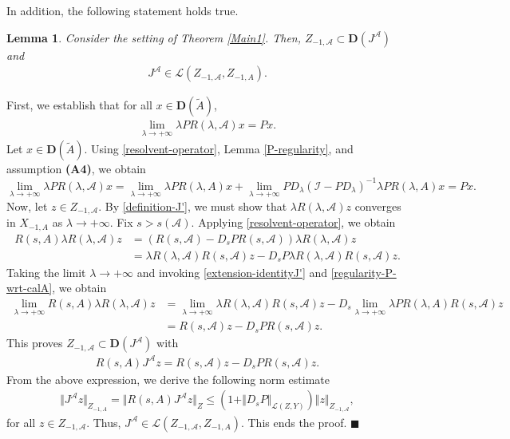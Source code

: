 \documentclass[onecolumn]{autart}
\def\la{\lambda}
\def\calL{{\mathcal{L}}}
\def\calA{{\mathcal{A}}}
\newtheorem{lemma}{Lemma}[section]
\numberwithin{equation}{section}
\newenvironment{proof}{{\it Proof: \enspace}}{\hfill $\blacksquare$\par}
\begin{document}
In addition, the following statement holds true.
	\begin{lemma}\label{technical-lem2}
		Consider the setting of Theorem \ref{Main1}. Then, $Z_{-1,\calA}\subset {\bm D}(J^\calA)$ and
		\begin{align}\label{boundness-J'}
			J^\calA \in \calL(Z_{-1,\calA},Z_{-1,A}).
		\end{align}
	\end{lemma}
	\begin{proof}
		First, we establish that for all $x\in {\bm D}(\tilde{A})$,
		\begin{align}\label{regularity-P-wrt-calA}
			\lim_{\la \to +\infty}\la PR(\la,\calA)x=Px.
		\end{align}
		Let $x\in {\bm D}(\tilde{A})$. Using \eqref{resolvent-operator},  Lemma \ref{P-regularity}, and assumption {\bf (A4)}, we obtain
		\begin{equation*}
			\lim_{\la \to +\infty}\la PR(\la,\calA)x =\lim_{\la \to +\infty}\la PR(\la,A)x+\lim_{\la \to +\infty}  PD_\la (\mathcal{I}-PD_\la )^{-1}\la PR(\la,A)x
			=Px.
		\end{equation*}
		Now, let $z\in Z_{-1,\calA}$. By \eqref{definition-J'}, we must show that $\la R(\la,\calA)z$ converges in $X_{-1,A}$ as $\la \to +\infty$. Fix $ s>s(\calA)$. Applying \eqref{resolvent-operator}, we obtain
		\begin{align*}
			R(s,A)\la R(\la,\calA)z&=(R(s,\calA)-D_s PR(s,\calA))\la R(\la,\calA) z\\
			&=\la R(\la,\calA) R(s,\calA)z-D_s P\la R(\la,\calA)R(s,\calA)z.
		\end{align*}
		Taking the limit $\lambda \to +\infty$ and invoking \eqref{extension-identityJ'} and \eqref{regularity-P-wrt-calA}, we obtain
		\begin{align*}
			\lim_{\la \to +\infty}R(s,A)\la R(\la,\calA)z&=\lim_{\la \to +\infty}\la R(\la,\calA) R(s,\calA)z-D_s \lim_{\la \to +\infty}\la P R(\la,A)R(s,\calA)z\\
			&=R(s,\calA)z-D_s PR(s,\calA)z.
		\end{align*}
		This proves $Z_{-1,\calA}\subset {\bm D}(J^\calA)$  with
		\begin{align*}
			R(s,A)J^\calA z=R(s,\calA)z-D_s PR(s,\calA)z.
		\end{align*}
		From the above expression, we derive the following norm estimate
		\begin{align*}
			\Vert J^\calA z\Vert_{Z_{-1,A}}=\Vert R(s, A)J^\calA z\Vert_{Z}
			\le \left(1+\Vert D_s P\Vert_{\calL(Z,Y)}\right)\Vert z\Vert_{Z_{-1,\calA}},
		\end{align*}
		for all $z\in Z_{-1,\calA}$. Thus, $J^\calA \in \calL(Z_{-1,\calA},Z_{-1,A})$. This ends the proof.
	\end{proof}
	
\end{document}
